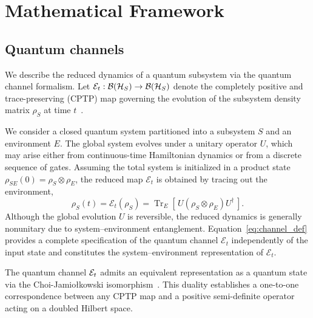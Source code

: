 \documentclass[pra,twocolumn,aps,showpacs,superscriptaddress,longbibliography]{revtex4-2}%
\newcommand{\jami}{Choi-Jamiołkowski}
\begin{document}
\section{Mathematical Framework} \label{sec:formalism}

\subsection{Quantum channels}\label{sec:reduced_dynamics}

We describe the reduced dynamics of a quantum subsystem via the quantum channel formalism. Let $\mathcal{E}_t: \mathcal{B}(\mathcal{H}_S) \to \mathcal{B}(\mathcal{H}_S)$ denote the completely positive and trace-preserving (CPTP) map governing the evolution of the subsystem density matrix $\rho_S$ at time $t$~\cite{nielsen_2010_quantum,bengtsson_2006_geometry}.

We consider a closed quantum system partitioned into a subsystem $S$ and an environment $E$. The global system evolves under a unitary operator $U$, which may arise either from continuous-time Hamiltonian dynamics or from a discrete sequence of gates. Assuming the total system is initialized in a product state $\rho_{SE}(0)=\rho_S\otimes\rho_E$, the reduced map $\mathcal{E}_t$ is obtained by tracing out the environment,
\begin{equation}\label{eq:channel_def}
\rho_S(t)=\mathcal{E}_t(\rho_S)=\operatorname{Tr}_E\!\left[\,U(\rho_S\otimes\rho_E)U^\dagger\,\right].
\end{equation}
Although the global evolution $U$ is reversible, the reduced dynamics is generally nonunitary due to system–environment entanglement. Equation~\eqref{eq:channel_def} provides a complete specification of the quantum channel $\mathcal{E}_t$ independently of the input state and constitutes the system–environment representation of $\mathcal{E}_t$.

The quantum channel $\mathcal{E}_t$ admits an equivalent representation as a quantum state via the \jami{}  isomorphism~\cite{jamiolkowski_1972_linear,choi_1975_completely}. This duality establishes a one-to-one correspondence between any CPTP map and a positive semi-definite operator acting on a doubled Hilbert space.
\end{document}
